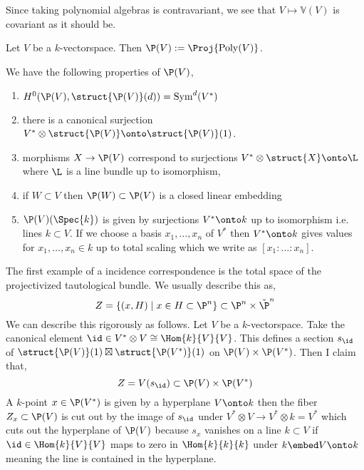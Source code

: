 \documentclass[12pt]{article}
\begin{document}
\begin{rmk}
Since taking polynomial algebras is contravariant, we see that $V \mapsto \mathbb{V}(V)$ is covariant as it should be.
\end{rmk}

\begin{defn}
Let $V$ be a $k$-vectorspace. Then $\P(V) := \Proj{\mathrm{Poly}(V)}$. 
\end{defn}

\begin{rmk}
We have the following properties of $\P(V)$,
\begin{enumerate}
\item $H^0(\P(V), \struct{\P(V)}(d)) = \mathrm{Sym}^d(V^*)$
\item there is a canonical surjection $V^* \otimes \struct{\P(V)} \onto \struct{\P(V)}(1)$.
\item morphisms $X \to \P(V)$ correspond to surjections $V^* \otimes \struct{X} \onto \L$ where $\L$ is a line bundle up to isomorphism,
\begin{center}
\end{center}
\item if $W \subset V$ then $\P(W) \subset \P(V)$ is a closed linear embedding
\item $\P(V)(\Spec{k})$ is given by surjections $V^* \onto k$ up to isomorphism i.e. lines $k \subset V$. If we choose a basis $x_1, \dots, x_n$ of $V^*$ then $V^* \onto k$ gives values for $x_1, \dots, x_n \in k$ up to total scaling which we write as $[x_1 : \dots : x_n]$.
\end{enumerate} 
\end{rmk}
\noindent
The first example of a incidence correspondence is the total space of the projectivized tautological bundle. We usually describe this as,
\[ Z = \{ (x, H) \mid x \in H \subset \P^n \} \subset \P^n \times \check{\P}^n \]
We can describe this rigorously as follows. Let $V$ be a $k$-vectorspace. Take the canonical element $\id \in V^* \otimes V \cong \Hom{k}{V}{V}$. This defines a section $s_{\id}$ of $\struct{\P(V)}(1) \boxtimes \struct{\P(V^*)}(1)$ on $\P(V) \times \P(V^*)$. Then I claim that,
\[ Z = V(s_{\id}) \subset \P(V) \times \P(V^*) \]
A $k$-point $x \in \P(V^*)$ is given by a hyperplane $V \onto k$ then the fiber $Z_x \subset \P(V)$ is cut out by the image of $s_\id$ under $V^* \otimes V \to V^* \otimes k = V^*$ which cuts out the hyperplane of $\P(V)$ because $s_x$ vanishes on a line $k \subset V$ if $\id \in \Hom{k}{V}{V}$ maps to zero in $\Hom{k}{k}{k}$ under $k \embed V \onto k$ meaning the line is contained in the hyperplane.
\end{document}

